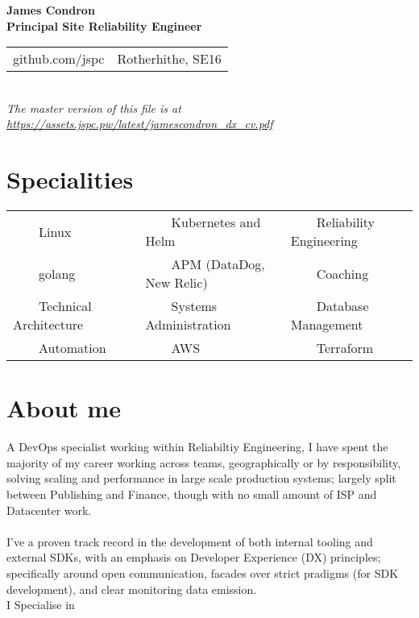 \documentclass[11pt,a4paper,sans]{article}
\newcommand{\tabitem}{~~\llap{\textbullet}~~}
\begin{document}
\begin{center}
  {\huge\textbf{James Condron}}\\
  \textbf{Principal Site Reliability Engineer} \\

  \begin{tabular}{rl}
    github.com/jspc &  Rotherhithe, SE16
  \end{tabular} \\

  {\footnotesize\textit{The master version of this file is at \url{https://assets.jspc.pw/latest/jamescondron_dx_cv.pdf}}}
\end{center}

\section{Specialities}
\begin{tabular}{lll}
\tabitem Linux & \tabitem Kubernetes and Helm & \tabitem Reliability Engineering \\
\tabitem golang & \tabitem APM (DataDog, New Relic) & \tabitem Coaching \\
\tabitem Technical Architecture & \tabitem Systems Administration & \tabitem Database Management \\
\tabitem Automation & \tabitem AWS & \tabitem Terraform  \\
\end{tabular}

\section{About me}
A DevOps specialist working within Reliabiltiy Engineering, I have spent the majority of my career working across teams, geographically or by responsibility, solving scaling and performance in large scale production systems; largely split between Publishing and Finance, though with no small amount of ISP and Datacenter work. \\
\\
I've a proven track record in the development of both internal tooling and external SDKs, with an emphasis on Developer Experience (DX) principles; specifically around open communication, facades over strict pradigms (for SDK development), and clear monitoring data emission.
\\
I Specialise in
\end{document}
